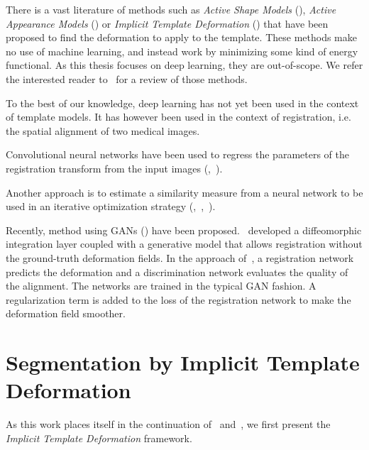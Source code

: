 There is a vast literature of methods such as \textit{Active Shape Models} (\textcite{cootes1995}), \textit{Active Appearance Models} (\textcite{cootes1998ECCV}) or \textit{Implicit Template Deformation} (\textcite{saddi2007}) that have been proposed to find the deformation to apply to the template. These methods make no use of machine learning, and instead work by minimizing some kind of energy functional. As this thesis focuses on deep learning, they are out-of-scope. We refer the interested reader to~\textcite{heimann2009} for a review of those methods.

To the best of our knowledge, deep learning has not yet been used in the context of template models. It has however been used in the context of registration, i.e. the spatial alignment of two medical images.

Convolutional neural networks have been used to regress the parameters of the registration transform from the input images (\textcite{miao2016},~\textcite{yang2016}).

Another approach is to estimate a similarity measure from a neural network to be used in an iterative optimization strategy (\textcite{wu2013MICCAI},~\textcite{cheng2015},~\textcite{simonovosky2016MICCAI}).

Recently, method using GANs (\textcite{goodfellow2014}) have been proposed.~\textcite{dalca2018MICCAI} developed a diffeomorphic integration layer coupled with a generative model that allows registration without the ground-truth deformation fields. In the approach of~\textcite{fan2018MICCAI}, a registration network predicts the deformation and a discrimination network evaluates the quality of the alignment. The networks are trained in the typical GAN fashion. A regularization term is added to the loss of the registration network to make the deformation field smoother.

\section{Segmentation by Implicit Template Deformation}
\label{sec:implicit}

As this work places itself in the continuation of~\textcite{mory2012MICCAI} and~\textcite{prevost2013PHD}, we first present the \textit{Implicit Template Deformation} framework. 

